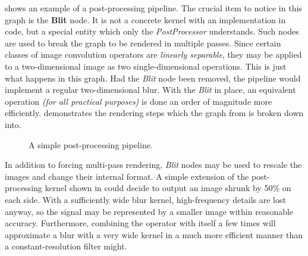  shows an example of a post-processing pipeline. The crucial item to notice in this graph is the \textbf{Blit} node. It is not a concrete kernel with an implementation in code, but a special entity which only the \emph{PostProcessor} understands. Such nodes are used to break the graph to be rendered in multiple passes. Since certain classes of image convolution operators are \emph{linearly separable}, they may be applied to a two-dimensional image as two single-dimensional operations. This is just what happens in this graph. Had the \emph{Blit} node been removed, the pipeline would implement a regular two-dimensional blur. With the \emph{Blit} in place, an equivalent operation \emph{(for all practical purposes)} is done an order of magnitude more efficiently.  demonstrates the rendering steps which the graph from  is broken down into.

\begin{figure}[ht!]
  \centering
  \caption[Simple post-processing with breakdown]{A simple post-processing pipeline.}
\label{fig:SimplePostProcWithBreakdown}
\end{figure}

In addition to forcing multi-pass rendering, \emph{Blit} nodes may be used to rescale the images and change their internal format. A simple extension of the post-processing kernel shown in  could decide to output an image shrunk by 50\% on each side. With a sufficiently wide blur kernel, high-frequency details are lost anyway, so the signal may be represented by a smaller image within reasonable accuracy. Furthermore, combining the operator with itself a few times will approximate a blur with a very wide kernel in a much more efficient manner than a constant-resolution filter might.

